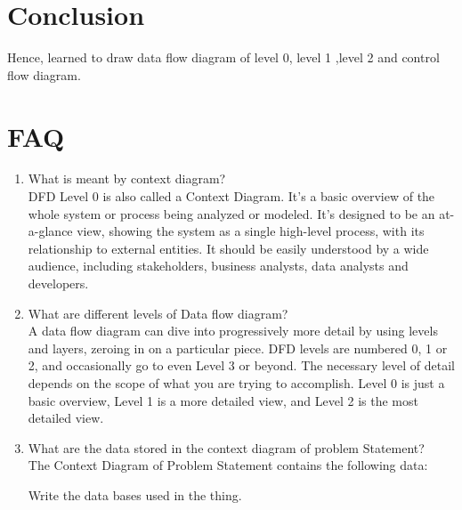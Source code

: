 \documentclass[11pt]{article}
\begin{document}
\section{Conclusion}
Hence, learned to draw data flow diagram of level 0, level 1 ,level 2 and control flow
diagram.

\section{FAQ}

\begin{enumerate}
	\item What is meant by context diagram?\\
	      DFD Level 0 is also called a Context Diagram. It's a basic overview of the whole system or process being analyzed or modeled. It's designed to be an at-a-glance view, showing the system as a single high-level process, with its relationship to external entities. It should be easily understood by a wide audience, including stakeholders, business analysts, data analysts and developers.

	\item What are different levels of Data flow diagram?\\

	      A data flow diagram can dive into progressively more detail by using levels and layers, zeroing in on a particular piece.  DFD levels are numbered 0, 1 or 2, and occasionally go to even Level 3 or beyond. The necessary level of detail depends on the scope of what you are trying to accomplish. Level 0 is just a basic overview, Level 1 is a more detailed view, and Level 2 is the most detailed view.

	\item What are the data stored in the context diagram of problem Statement?\\
	      The Context Diagram of Problem Statement contains the following data:

	      Write the data bases used in the thing.

\end{enumerate}
\end{document}
